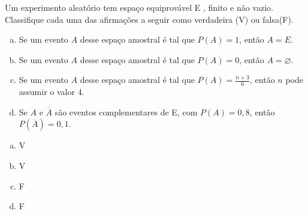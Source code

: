 \begin{ex}
Um experimento aleatório tem espaço equiprovável E , finito e não vazio. Classifique  cada uma das afirmações a seguir como verdadeira (V) ou falsa(F).
   \begin{enumerate}[(a)]
   \item Se um evento $A$ desse espaço amostral é tal que $P(A)=1$, então  $A  = E$.
   \item Se um evento $A$ desse espaço amostral é tal que $P(A)=0$, então $A = \varnothing$. 
   \item Se um evento $A$ desse espaço amostral é tal que $P(A)=\frac{n+3}{6}$, então $n$ pode assumir o valor 4.
   \item Se $A$ e $\overline A$ são eventos complementares de E, com $P(A)=0,8$, então  $P(\overline A)=0,1$.
   \end{enumerate}
     \begin{sol}
      \phantom{A}
       \begin{enumerate} [(a)]
           \item V
           \item V
           \item F
           \item F
       \end{enumerate}
     \end{sol}
\end{ex}